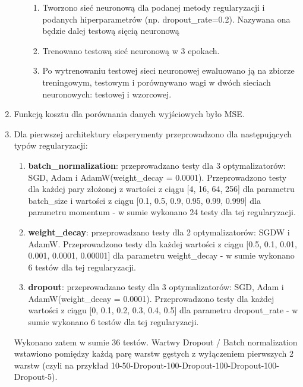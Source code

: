 \documentclass[12pt]{article}
\begin{document}
\begin{enumerate}
\begin{enumerate}
\begin{enumerate}
			\item Tworzono sieć neuronową dla podanej metody regularyzacji i podanych hiperparametrów (np. dropout\_rate=0.2). Nazywana ona będzie dalej testową sięcią neuronową
			\item Trenowano testową sieć neuronową w 3 epokach.
			\item Po wytrenowaniu testowej sieci neuronowej ewaluowano ją na zbiorze treningowym, testowym i porównywano wagi w dwóch sieciach neuronowych: testowej i wzorcowej.
		\end{enumerate}
	\end{enumerate}
	\item Funkcją kosztu dla porównania danych wyjściowych było MSE.
	\item Dla pierwszej architektury eksperymenty przeprowadzono dla następujących typów regularyzacji:
	\begin{enumerate}
		\item \textbf{batch\_normalization}: przeprowadzano testy dla 3 optymalizatorów: SGD, Adam i AdamW(weight\_decay = 0.0001). Przeprowadzono testy dla każdej pary złożonej z wartości z ciągu [4, 16, 64, 256] dla parametru batch\_size i wartości z ciągu [0.1, 0.5, 0.9, 0.95, 0.99, 0.999] dla parametru momentum - w sumie wykonano 24 testy dla tej regularyzacji.
		
		\item \textbf{weight\_decay}: przeprowadzano testy dla 2 optymalizatorów: SGDW i AdamW. Przeprowadzono testy dla każdej wartości z ciągu [0.5, 0.1, 0.01, 0.001, 0.0001, 0.00001] dla parametru weight\_decay - w sumie wykonano 6 testów dla tej regularyzacji.
		
		\item \textbf{dropout}: przeprowadzano testy dla 3 optymalizatorów: SGD, Adam i AdamW(weight\_decay = 0.0001). Przeprowadzono testy dla każdej wartości z ciągu [0, 0.1, 0.2, 0.3, 0.4, 0.5] dla parametru dropout\_rate - w sumie wykonano 6 testów dla tej regularyzacji.
	\end{enumerate}
	Wykonano zatem w sumie 36 testów. Wartwy Dropout / Batch normalization wstawiono pomiędzy każdą parę warstw gęstych z wyłączeniem pierwszych 2 warstw (czyli na przykład 10-50-Dropout-100-Dropout-100-Dropout-100-Dropout-5).
	

\end{enumerate}
\end{document}
